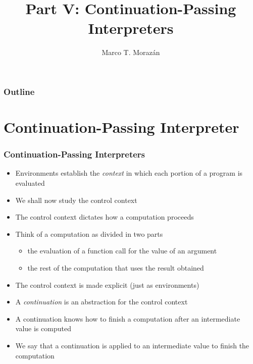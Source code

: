 \documentclass{beamer}
\begin{document}
\title{Part V: Continuation-Passing Interpreters}
\author{Marco T. Moraz\'{a}n}
\date{}

\begin{frame}
\titlepage
\end{frame}

\begin{frame}
\frametitle{Outline}
\tableofcontents
\end{frame}


\section{Continuation-Passing Interpreter}

\begin{frame}[fragile]
\frametitle{Continuation-Passing Interpreters}
\begin{scriptsize}
\begin{itemize}
\item<1-> Environments establish the \textit{context} in which each portion of a program is evaluated

\item<2-> We shall now study the control context

\item<2-> The control context dictates how a computation proceeds

\item<3-> Think of a computation as divided in two parts
  \begin{itemize}
    \item the evaluation of a function call for the value of an argument
    \item the rest of the computation that uses the result obtained
  \end{itemize}

\item<4-> The control context is made explicit (just as environments)

\item<5-> A \textit{continuation} is an abstraction for the control context

\item<5-> A continuation knows how to finish a computation after an intermediate value is computed

\item<5-> We say that a continuation is applied to an intermediate value to finish the computation

\end{itemize}
\end{scriptsize}
\end{frame}
\end{document}

